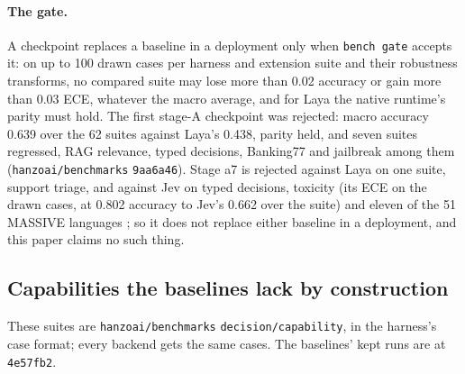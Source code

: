 \paragraph{The gate.}
A checkpoint replaces a baseline in a deployment only when \texttt{bench gate}
accepts it: on up to 100 drawn cases per harness and extension suite and their
robustness transforms, no compared suite may lose more than 0.02 accuracy or
gain more than 0.03 ECE, whatever the macro average, and for Laya the native
runtime's parity must hold. The first stage-A checkpoint was rejected: macro
accuracy 0.639 over the 62 suites against Laya's 0.438, parity held, and seven
suites regressed, RAG relevance, typed decisions, Banking77 and jailbreak among
them \meas{} (\texttt{hanzoai/benchmarks} \texttt{9aa6a46}). Stage a7 is
rejected against Laya on one suite, support triage, and against Jev on typed
decisions, toxicity (its ECE on the drawn cases, at 0.802 accuracy to Jev's
0.662 over the suite) and eleven of the 51 MASSIVE languages \meas; so it does
not replace either baseline in a deployment, and this paper claims no such
thing.

\subsection{Capabilities the baselines lack by construction}
\label{sec:capabilities}

These suites are \texttt{hanzoai/benchmarks} \texttt{decision/capability}, in
the harness's case format; every backend gets the same cases. The baselines'
kept runs are at \texttt{4e57fb2}.

